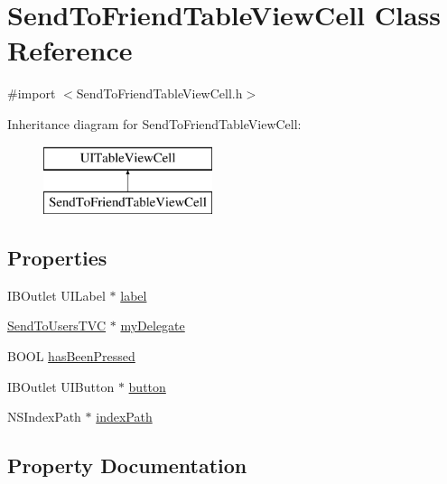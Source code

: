 \hypertarget{interface_send_to_friend_table_view_cell}{}\section{Send\+To\+Friend\+Table\+View\+Cell Class Reference}
\label{interface_send_to_friend_table_view_cell}


{\ttfamily \#import $<$Send\+To\+Friend\+Table\+View\+Cell.\+h$>$}

Inheritance diagram for Send\+To\+Friend\+Table\+View\+Cell\+:\begin{figure}[H]
\begin{center}
\leavevmode
\includegraphics[height=2.000000cm]{interface_send_to_friend_table_view_cell}
\end{center}
\end{figure}
\subsection*{Properties}
\begin{DoxyCompactItemize}
\item 
I\+B\+Outlet U\+I\+Label $\ast$ \hyperlink{interface_send_to_friend_table_view_cell_acf447bfd89fe2548da461ea7d01c7041}{label}
\item 
\hyperlink{interface_send_to_users_t_v_c}{Send\+To\+Users\+T\+VC} $\ast$ \hyperlink{interface_send_to_friend_table_view_cell_a8371ead0bafd6fae72171056eeb4e184}{my\+Delegate}
\item 
B\+O\+OL \hyperlink{interface_send_to_friend_table_view_cell_a1f1f8adda4526099d3fe27e0452180bf}{has\+Been\+Pressed}
\item 
I\+B\+Outlet U\+I\+Button $\ast$ \hyperlink{interface_send_to_friend_table_view_cell_a7f3916454c4450f55b3ed05c8db90011}{button}
\item 
N\+S\+Index\+Path $\ast$ \hyperlink{interface_send_to_friend_table_view_cell_a62cf0fc74c721748ead928a25ce397e3}{index\+Path}
\end{DoxyCompactItemize}


\subsection{Property Documentation}
\hypertarget{interface_send_to_friend_table_view_cell_a7f3916454c4450f55b3ed05c8db90011}{}\label{interface_send_to_friend_table_view_cell_a7f3916454c4450f55b3ed05c8db90011} 
